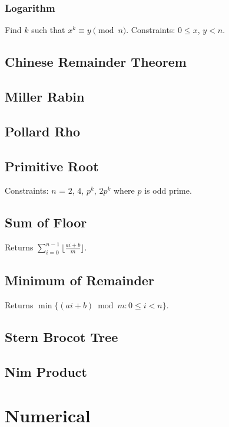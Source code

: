 \documentclass{article}
\begin{document}
\begin{multicols}{3}
    \subsubsection{Logarithm}
    Find $k$ such that $x^k\equiv y\pmod n$.
    \newline Constraints: $0\le x$, $y<n$.
    
    \subsection{Chinese Remainder Theorem}
    
    \subsection{Miller Rabin}
    
    \subsection{Pollard Rho}
    
    \subsection{Primitive Root}
    Constraints: $n$ = $2$, $4$, $p^k$, $2p^{k}$ where $p$ is odd prime.
    
    \subsection{Sum of Floor}
    Returns $\sum_{i=0}^{n-1}\lfloor\frac{ai+b}{m}\rfloor$.
    
    \subsection{Minimum of Remainder}
    Returns $\min\{(ai+b)\bmod m:0\le i<n\}$.
    
    \subsection{Stern Brocot Tree}
    
    \subsection{Nim Product}
    

    \section{Numerical}

\end{multicols}
\end{document}
